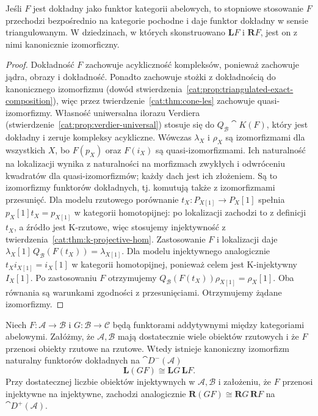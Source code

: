 \begin{wniosek}\label{cat:cor:exact-total-derived}
Jeśli $F$ jest dokładny jako funktor kategorii abelowych, to stopniowe stosowanie $F$ przechodzi bezpośrednio na kategorie pochodne i daje funktor dokładny w sensie triangulowanym. W dziedzinach, w których skonstruowano $\mathbf L F$ i $\mathbf R F$, jest on z nimi kanonicznie izomorficzny.
\end{wniosek}
\begin{proof}
Dokładność $F$ zachowuje acykliczność kompleksów, ponieważ zachowuje jądra, obrazy i dokładność. Ponadto zachowuje stożki z dokładnością do kanonicznego izomorfizmu (dowód stwierdzenia~\ref{cat:prop:triangulated-exact-composition}), więc przez twierdzenie~\ref{cat:thm:cone-les} zachowuje quasi-izomorfizmy. Własność uniwersalna ilorazu Verdiera (stwierdzenie~\ref{cat:prop:verdier-universal}) stosuje się do $Q_{\mathcal B}\cat K(F)$, który jest dokładny i zeruje kompleksy acykliczne. Wówczas $\lambda_X$ i $\rho_X$ są izomorfizmami dla wszystkich $X$, bo $F(p_X)$ oraz $F(i_X)$ są quasi-izomorfizmami. Ich naturalność na lokalizacji wynika z naturalności na morfizmach zwykłych i odwróceniu kwadratów dla quasi-izomorfizmów; każdy dach jest ich złożeniem. Są to izomorfizmy funktorów dokładnych, tj. komutują także z izomorfizmami przesunięć. Dla modelu rzutowego porównanie $t_X:P_{X[1]}\to P_X[1]$ spełnia $p_X[1]t_X=p_{X[1]}$ w kategorii homotopijnej: po lokalizacji zachodzi to z definicji $t_X$, a źródło jest K-rzutowe, więc stosujemy injektywność z twierdzenia~\ref{cat:thm:k-projective-hom}. Zastosowanie $F$ i lokalizacji daje $\lambda_X[1]\,Q_{\mathcal B}(F(t_X))=\lambda_{X[1]}$. Dla modelu injektywnego analogicznie $t_X i_{X[1]}=i_X[1]$ w kategorii homotopijnej, ponieważ celem jest K-injektywny $I_X[1]$. Po zastosowaniu $F$ otrzymujemy $Q_{\mathcal B}(F(t_X))\rho_{X[1]}=\rho_X[1]$. Oba równania są warunkami zgodności z przesunięciami. Otrzymujemy żądane izomorfizmy.
\end{proof}
\begin{stwierdzenie}\label{cat:prop:total-derived-composition}
Niech $F:\mathcal A\to\mathcal B$ i $G:\mathcal B\to\mathcal C$ będą funktorami addytywnymi między kategoriami abelowymi. Załóżmy, że $\mathcal A,\mathcal B$ mają dostatecznie wiele obiektów rzutowych i że $F$ przenosi obiekty rzutowe na rzutowe. Wtedy istnieje kanoniczny izomorfizm naturalny funktorów dokładnych na $\cat D^-(\mathcal A)$
\[
 \mathbf L(GF)\cong\mathbf L G\,\mathbf L F.
\]
Przy dostatecznej liczbie obiektów injektywnych w $\mathcal A,\mathcal B$ i założeniu, że $F$ przenosi injektywne na injektywne, zachodzi analogicznie $\mathbf R(GF)\cong\mathbf R G\,\mathbf R F$ na $\cat D^+(\mathcal A)$.
\end{stwierdzenie}
